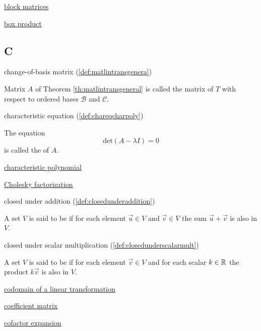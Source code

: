\documentclass{ximera}
\begin{document}

\href{https://ximera.osu.edu/oerlinalg/LinearAlgebra/MAT-0023/main}{block matrices}

\href{https://ximera.osu.edu/oerlinalg/LinearAlgebra/DET-0070/main}{box product}

\subsection{C}

change-of-basis matrix (\ref{def:matlintransgenera})
\begin{expandable}
    Matrix $A$ of Theorem \ref{th:matlintransgeneral} is called the matrix of $T$ with respect to ordered bases $\mathcal{B}$ and $\mathcal{C}$.
\end{expandable}

characteristic equation (\ref{def:chareqcharpoly})
\begin{expandable}
    The equation 
$$\mbox{det}(A-\lambda I) = 0$$ is called the  of $A$. 
\end{expandable}

\href{https://ximera.osu.edu/oerlinalg/LinearAlgebra/EIG-0020/main}{characteristic polynomial}

\href{https://ximera.osu.edu/oerlinalg/LinearAlgebra/RTH-0045/main}{Cholesky factorization}

closed under addition (\ref{def:closedunderaddition})
\begin{expandable}
    A set $V$ is said to be  if for each element $\vec{u} \in V$ and $\vec{v} \in V$ the sum $\vec{u}+\vec{v}$ is also in $V$.
\end{expandable}

closed under scalar multiplication (\ref{def:closedunderscalarmult})
\begin{expandable}
    A set $V$ is said to be  if for each element $\vec{v} \in V$  and for each scalar $k \in \mathbb{R}$ the product $k\vec{v}$ is also in $V$.
\end{expandable}

\href{https://ximera.osu.edu/oerlinalg/LinearAlgebra/LTR-0010/main}{codomain of a linear transformation}

\href{https://ximera.osu.edu/oerlinalg/LinearAlgebra/SYS-0020/main}{coefficient matrix}

\href{https://ximera.osu.edu/oerlinalg/LinearAlgebra/DET-0010/main}{cofactor expansion}
\end{document}
